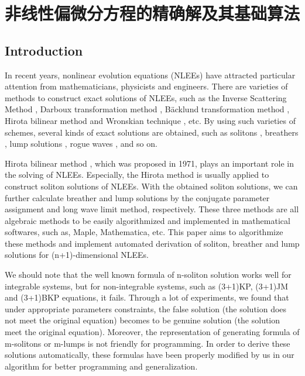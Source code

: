 \chapter{非线性偏微分方程的精确解及其基础算法}
\section{Introduction}\label{Introduction-01}
In recent years, nonlinear evolution equations (NLEEs) have attracted particular attention from mathematicians, physicists and engineers. There are varieties of methods to construct exact solutions of NLEEs, such as the Inverse Scattering Method \cite{kawata1978inverse,ma2014verifying}, Darboux transformation method \cite{matveev1991darboux,ling2018general,lou1997non}, B{\"a}cklund transformation method \cite{wahlquist1973backlund,li2008method,cheng2015multiple}, Hirota bilinear method \cite{hirota1971exact,hereman1991exact,hu2002application,hirota2003vector,ma2015lump} and Wronskian technique \cite{freeman1983soliton,ito1988reduce,wu2008n}, etc. By using such varieties of schemes, several kinds of exact solutions are obtained, such as solitons \cite{hirota1971exact,makhankov1980computer}, breathers \cite{tajiri1989breather,guo2011rogue,sun2018general}, lump solutions \cite{satsuma1979two,villarroel1999discrete,imai1997dromion}, rogue waves \cite{guo2011rogue,zhang2014rogue,sun2018general,zhaqilao2018symbolic}, and so on.

Hirota bilinear method \cite{hirota1971exact}, which was proposed in 1971, plays an important role in the solving of NLEEs. Especially, the Hirota method is usually applied to construct soliton solutions of NLEEs. With the obtained soliton solutions, we can further calculate breather and lump solutions by the conjugate parameter assignment \cite{tajiri1989breather} and long wave limit \cite{satsuma1979two} method, respectively. These three methods are all algebraic methods to be easily algorithmized and implemented in mathematical softwares, such as, Maple, Mathematica, etc. This paper aims to algorithmize these methods and  implement automated derivation of soliton, breather and lump solutions for (n+1)-dimensional NLEEs.


We should note that the well known formula of n-soliton solution works well for integrable systems, but for non-integrable systems, such as (3+1)KP\CITEcaKP, (3+1)JM\CITEcaJM{} and (3+1)BKP\CITEcaBKP{} equations, it fails. Through a lot of experiments, we found that under appropriate parameters constraints, the false solution (the solution does not meet the original equation) becomes to be genuine solution (the solution meet the original equation). Moreover, the representation of generating formula of m-solitons or m-lumps is not friendly for programming. In order to derive these solutions automatically, these formulas have been properly modified by us in our algorithm for better programming and generalization.

